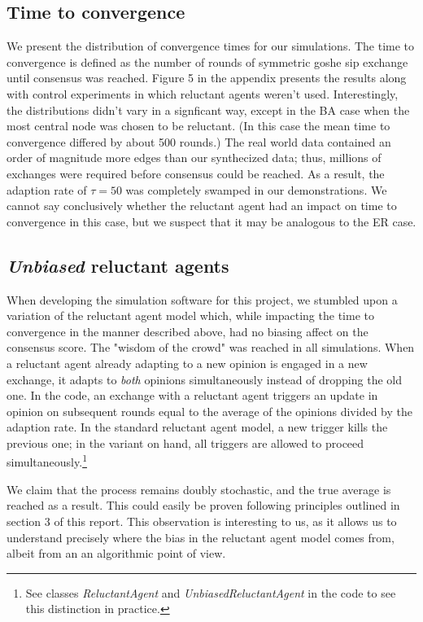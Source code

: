 \documentclass[letter]{article}
\theoremstyle{remark}
\begin{document}
\subsection{Time to convergence}
We present the distribution of convergence times for our simulations. The time to convergence is defined as the number of rounds of symmetric goshe sip exchange until consensus was reached. Figure 5 in the appendix presents the results along with control experiments in which reluctant agents weren't used. Interestingly, the distributions didn't vary in a signficant way, except in the BA case when the most central node was chosen to be reluctant. (In this case the mean time to convergence differed by about 500 rounds.) The real world data contained an order of magnitude more edges than our synthecized data; thus, millions of exchanges were required before consensus could be reached. As a result, the adaption rate of $\tau = 50$ was completely swamped in our demonstrations. We cannot say conclusively whether the reluctant agent had an impact on time to convergence in this case, but we suspect that it may be analogous to the ER case. 


\subsection{\emph{Unbiased} reluctant agents}
When developing the simulation software for this project, we stumbled upon a variation of the reluctant agent model which, while impacting the time to convergence in the manner described above, had no biasing affect on the consensus score. The "wisdom of the crowd" was reached in all simulations. When a reluctant agent already adapting to a new opinion is engaged in a new exchange, it adapts to \emph{both} opinions simultaneously instead of dropping the old one. In the code, an exchange with a reluctant agent triggers an update in opinion on subsequent rounds equal to the average of the opinions divided by the adaption rate. In the standard reluctant agent model, a new trigger kills the previous one; in the variant on hand, all triggers are allowed to proceed simultaneously.\footnote{See classes \textit{ReluctantAgent} and \textit{UnbiasedReluctantAgent} in the code to see this distinction in practice.} 

We claim that the process remains doubly stochastic, and the true average is reached as a result. This could easily be proven following principles outlined in section 3 of this report. This observation is interesting to us, as it allows us to understand precisely where the bias in the reluctant agent model comes from, albeit from an an algorithmic point of view.
\end{document}
